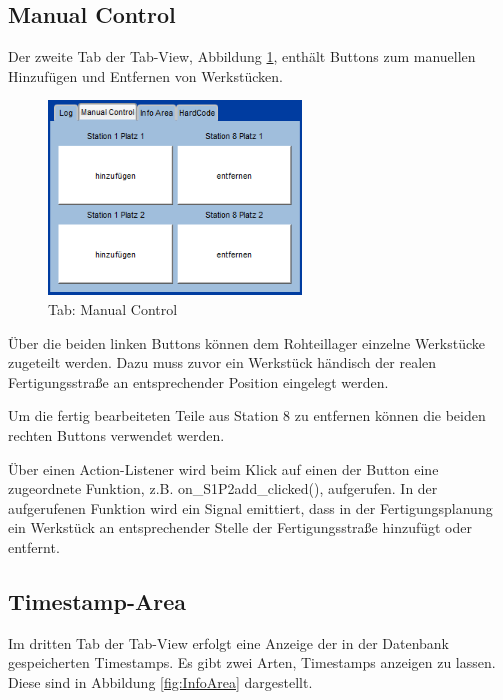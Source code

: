 \subsection{Manual Control}

Der zweite Tab der Tab-View, Abbildung \ref{fig:ManualControl}, enthält Buttons zum manuellen Hinzufügen und Entfernen von Werkstücken. 

\begin{figure}[htb]
    \centering
    \includegraphics[width=0.6\textwidth]{Abbildungen/ManualControl.png}
    \caption{Tab: Manual Control}		
    \label{fig:ManualControl}
\end{figure}

Über die beiden linken Buttons können dem Rohteillager einzelne Werkstücke zugeteilt werden. Dazu muss zuvor ein Werkstück händisch der realen Fertigungsstraße an entsprechender Position eingelegt werden. 

Um die fertig bearbeiteten Teile aus Station 8 zu entfernen können die beiden rechten Buttons verwendet werden. 

Über einen Action-Listener wird beim Klick auf einen der Button eine zugeordnete Funktion, z.B. on\_S1P2add\_clicked(), aufgerufen. In der aufgerufenen Funktion wird ein Signal emittiert, dass in der Fertigungsplanung ein Werkstück an entsprechender Stelle der Fertigungsstraße hinzufügt oder entfernt. 

\subsection{Timestamp-Area}

Im dritten Tab der Tab-View erfolgt eine Anzeige der in der Datenbank gespeicherten Timestamps. Es gibt zwei Arten, Timestamps anzeigen zu lassen. Diese sind in Abbildung \ref{fig:InfoArea} dargestellt. 

